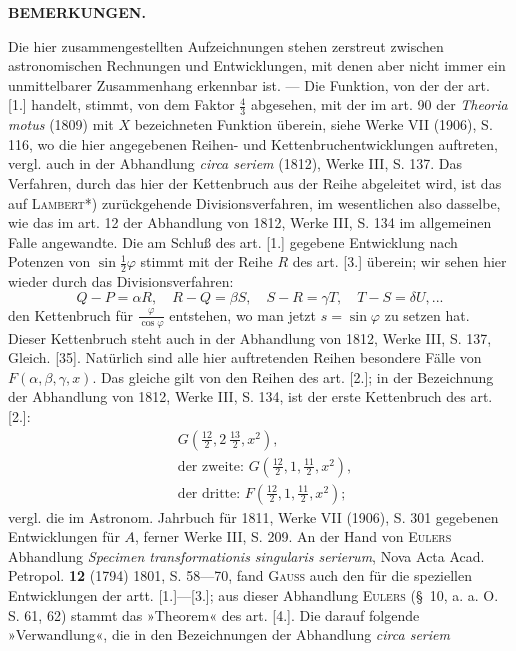 \begingroup
\makeatletter\tagsleft@true\let\veqno\@@leqno\makeatother
\clearpage{}
\begin{center}\bfseries BEMERKUNGEN.\end{center}
\par\indent Die hier zusammengestellten Aufzeichnungen stehen zerstreut zwischen astronomischen Rechnungen und Entwicklungen, mit denen aber nicht immer ein unmittelbarer Zusammenhang erkennbar ist. --- Die Funktion, von der der art. [1.] handelt, stimmt, von dem Faktor $\frac43$ abgesehen, mit der im art. 90 der \textit{Theoria motus} (1809) mit $X$ bezeichneten Funktion überein, siehe Werke VII (1906), S. 116, wo die hier angegebenen Reihen- und Kettenbruchentwicklungen auftreten, vergl. auch in der Abhandlung \textit{circa seriem} (1812), Werke III, S. 137. Das Verfahren, durch das hier der Kettenbruch aus der Reihe abgeleitet wird, ist das auf \textsc{Lambert}*) zurückgehende Divisionsverfahren, im wesentlichen also dasselbe, wie das im art. 12 der Abhandlung von 1812, Werke III, S. 134 im allgemeinen Falle angewandte. Die am Schluß des art. [1.] gegebene Entwicklung nach Potenzen von $\sin\frac12\varphi$ stimmt mit der Reihe $R$ des art. [3.] überein; wir sehen hier wieder durch das Divisionsverfahren:
\[Q-P=\alpha R,\quad R-Q=\beta S,\quad S-R=\gamma T,\quad T-S=\delta U,{.}{.}{.}\]
\noindent den Kettenbruch für $\frac\varphi{\cos\varphi}$ entstehen, wo man jetzt $s=\sin\varphi$ zu setzen hat. Dieser Kettenbruch steht auch in der Abhandlung von 1812, Werke III, S. 137, Gleich. [35]. Natürlich sind alle hier auftretenden Reihen besondere Fälle von $F(\alpha,\beta,\gamma,x)$. Das gleiche gilt von den Reihen des art. [2.]; in der Bezeichnung der Abhandlung von 1812, Werke III, S. 134, ist der erste Kettenbruch des art. [2.]:
\[\begin{aligned}
&G\left(\frac{12}2,2\ \frac{13}2,x^2\right),\\[.6em]
&\text{der zweite: }G\left(\frac{12}2,1,\frac{11}2,x^2\right),\\[.6em]
&\text{der dritte: }F\left(\frac{12}2,1,\frac{11}2,x^2\right);
\end{aligned}\]
\noindent vergl. die im Astronom. Jahrbuch für 1811, Werke VII (1906), S. 301 gegebenen Entwicklungen für $A$, ferner Werke III, S. 209. An der Hand von \textsc{Eulers} Abhandlung \textit{Specimen transformationis singularis serierum}, Nova Acta Acad. Petropol. \textbf{12} (1794) 1801, S. 58---70, fand \textsc{Gauss} auch den \linebreak für die speziellen Entwicklungen der artt. [1.]---[3.]; aus dieser Abhandlung \textsc{Eulers} (\S\ 10, a. a. O. S. 61, 62) stammt das »Theorem« des art. [4.]. Die darauf folgende »Verwandlung«, die in den Bezeichnungen der Abhandlung \textit{circa seriem}
